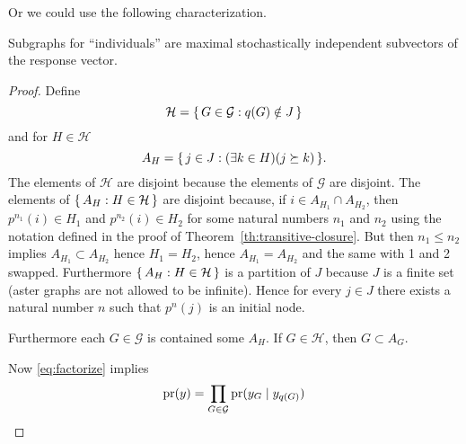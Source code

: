Or we could use the following characterization.
\begin{theorem}
Subgraphs for ``individuals'' are maximal stochastically independent
subvectors of the response vector.
\end{theorem}
\begin{proof}
Define
$$
   \mathcal{H} = \{\,  G \in \mathcal{G} : q(G) \notin J  \,\}
$$
and for $H \in \mathcal{H}$
$$
   A_H = \{\,  j \in J : (\exists k \in H)(j \succeq k)  \,\}.
$$
The elements of $\mathcal{H}$ are disjoint because the elements of
$\mathcal{G}$ are disjoint.
The elements of $\{\, A_H : H \in \mathcal{H} \,\}$ are disjoint
because, if $i \in A_{H_1} \cap A_{H_2}$, then $p^{n_1}(i) \in H_1$
and $p^{n_2}(i) \in H_2$ for some natural numbers $n_1$ and $n_2$
using the notation defined in the proof of Theorem~\ref{th:transitive-closure}.
But then $n_1 \le n_2$ implies $A_{H_1} \subset A_{H_2}$ hence $H_1 = H_2$,
hence $A_{H_1} = A_{H_2}$ and the same with 1 and 2 swapped.
Furthermore $\{\, A_H : H \in \mathcal{H} \,\}$ is a partition of $J$ because
$J$ is a finite set (aster graphs are not allowed to be infinite).
Hence for every $j \in J$ there exists a natural number $n$ such that
$p^n(j)$ is an initial node.


Furthermore each $G \in \mathcal{G}$ is contained some $A_H$.
If $G \in \mathcal{H}$, then $G \subset A_G$.

Now \eqref{eq:factorize} implies
$$
   \operatorname{pr}(y)
   =
   \prod_{G \in \mathcal{G}} \operatorname{pr}(y_G \mid y_{q(G)})
$$
\end{proof}

